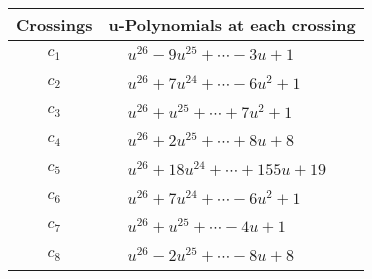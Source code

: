 \documentclass[1p]{elsarticle_modified}
\theoremstyle{definition}
\begin{document}
\begin{tabular}{m{50pt}|m{274pt}}
Crossings & \hspace{64pt}u-Polynomials at each crossing \\
\hline $$\begin{aligned}c_{1}\end{aligned}$$&$\begin{aligned}
&u^{26}-9 u^{25}+\cdots-3 u+1
\end{aligned}$\\
\hline $$\begin{aligned}c_{2}\end{aligned}$$&$\begin{aligned}
&u^{26}+7 u^{24}+\cdots-6 u^2+1
\end{aligned}$\\
\hline $$\begin{aligned}c_{3}\end{aligned}$$&$\begin{aligned}
&u^{26}+u^{25}+\cdots+7 u^2+1
\end{aligned}$\\
\hline $$\begin{aligned}c_{4}\end{aligned}$$&$\begin{aligned}
&u^{26}+2 u^{25}+\cdots+8 u+8
\end{aligned}$\\
\hline $$\begin{aligned}c_{5}\end{aligned}$$&$\begin{aligned}
&u^{26}+18 u^{24}+\cdots+155 u+19
\end{aligned}$\\
\hline $$\begin{aligned}c_{6}\end{aligned}$$&$\begin{aligned}
&u^{26}+7 u^{24}+\cdots-6 u^2+1
\end{aligned}$\\
\hline $$\begin{aligned}c_{7}\end{aligned}$$&$\begin{aligned}
&u^{26}+u^{25}+\cdots-4 u+1
\end{aligned}$\\
\hline $$\begin{aligned}c_{8}\end{aligned}$$&$\begin{aligned}
&u^{26}-2 u^{25}+\cdots-8 u+8
\end{aligned}$\\

\end{tabular}
\end{document}
